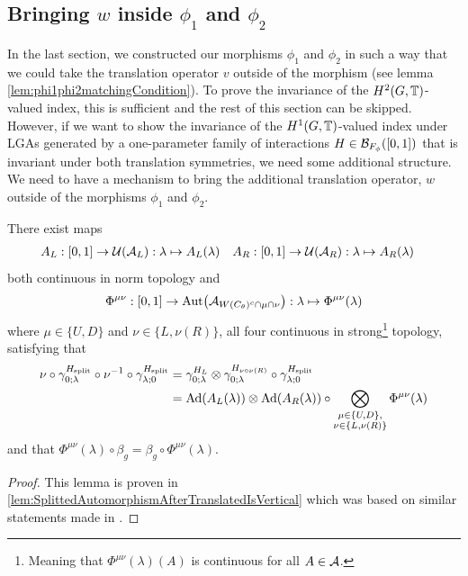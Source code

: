 \documentclass[11pt,a4paper,twoside]{article}
\numberwithin{equation}{section}
\begin{document}
	\subsection{Bringing \texorpdfstring{$w$}{} inside \texorpdfstring{$\phi_1$}{} and \texorpdfstring{$\phi_2$}{}}
	In the last section, we constructed our morphisms $\phi_1$ and $\phi_2$ in such a way that we could take the translation operator $v$ outside of the morphism (see lemma \ref{lem:phi1phi2matchingCondition}). To prove the invariance of the $H^2(G,\TT)$-valued index, this is sufficient and the rest of this section can be skipped. However, if we want to show the invariance of the $H^1(G,\TT)$-valued index under LGAs generated by a one-parameter family of interactions $H\in\BB_{F_\phi}([0,1])$ that is invariant under both translation symmetries, we need some additional structure. We need to have a mechanism to bring the additional translation operator, $w$ outside of the morphisms $\phi_1$ and $\phi_2$.
	\begin{lemma}\label{lem:TranslatingSplittedTimeEvolution}
		There exist maps
		\begin{align}
			A_L&:[0,1]\rightarrow \UU(\AA_L):\lambda\mapsto A_{L}(\lambda)&A_R&:[0,1]\rightarrow \UU(\AA_R):\lambda\mapsto A_{R}(\lambda)
		\end{align}
		both continuous in norm topology and
		\begin{align}
			\Phi^{\mu\nu}:[0,1]\rightarrow\Aut{\AA_{W(C_\theta)^c\cap\mu\cap\nu}}:\lambda\mapsto \Phi^{\mu\nu}(\lambda)
		\end{align}
		where $\mu\in\{U,D\}$ and $\nu\in\{L,\nu(R)\}$, all four continuous in strong\footnote{Meaning that $\Phi^{\mu\nu}(\lambda)(A)$ is continuous for all $A\in\AA$.} topology, satisfying that
		\begin{align}
			\nu\circ\gamma^{\Hsplit}_{0;\lambda}\circ\nu^{-1}\circ\gamma^{\Hsplit}_{\lambda;0}&=\gamma^{H_L}_{0;\lambda}\otimes\gamma^{H_{\nu\circ\nu(R)}}_{0;\lambda}\circ\gamma^{\Hsplit}_{\lambda;0}\\
			\label{eq:TranslatingSplittedTimeEvolution}
			&=\Ad{A_L(\lambda)}\otimes\Ad{A_R(\lambda)}\circ\bigotimes_{\substack{\mu\in\{U,D\},\\\nu\in\{L,\nu(R)\}}}\Phi^{\mu\nu}(\lambda)
		\end{align}
		and that $\Phi^{\mu\nu}(\lambda)\circ\beta_g=\beta_g\circ\Phi^{\mu\nu}(\lambda)$.
	\end{lemma}
	\begin{proof}
		This lemma is proven in \ref{lem:SplittedAutomorphismAfterTranslatedIsVertical} which was based on similar statements made in \cite{ogata2021h3gmathbb}.
	\end{proof}
\end{document}
